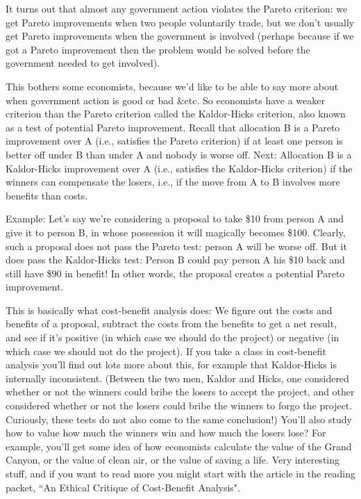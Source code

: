 It turns out that almost any government action violates the Pareto criterion: we get Pareto improvements when two people voluntarily trade, but we don't usually get Pareto improvements when the government is involved (perhaps because if we got a Pareto improvement then the problem would be solved before the government needed to get involved).

This bothers some economists, because we'd like to be able to say more about when government action is good or bad \&etc. So economists have a weaker criterion than the Pareto criterion called the Kaldor-Hicks criterion, also known as a test of potential Pareto improvement. Recall that allocation B is a Pareto improvement over A (i.e., satisfies the Pareto criterion) if at least one person is better off under B than under A and nobody is worse off. Next: Allocation B is a Kaldor-Hicks improvement over A (i.e., satisfies the Kaldor-Hicks criterion) if the winners can compensate the losers, i.e., if the move from A to B involves more benefits than costs. 

Example: Let's say we're considering a proposal to take \$10 from person A and give it to person B, in whose possession it will magically becomes \$100. Clearly, such a proposal does not pass the Pareto test: person A will be worse off. But it does pass the Kaldor-Hicks test: Person B could pay person A his \$10 back and still have \$90 in benefit! In other words, the proposal creates a potential Pareto improvement. 

 This is basically what cost-benefit analysis does: We figure out the costs and benefits of a proposal, subtract the costs from the benefits to get a net result, and see if it's positive (in which case we should do the project) or negative (in which case we should not do the project). If you take a class in cost-benefit analysis you'll find out lots more about this, for example that Kaldor-Hicks is internally inconsistent. (Between the two men, Kaldor and Hicks, one considered whether or not the winners could bribe the losers to accept the project, and other considered whether or not the losers could bribe the winners to forgo the project. Curiously, these tests do not also come to the same conclusion!) You'll also study how to value how much the winners win and how much the losers lose? For example, you'll get some idea of how economists calculate the value of the Grand Canyon, or the value of clean air, or the value of saving a life. Very interesting stuff, and if you want to read more you might start with the article in the reading packet, ``An Ethical Critique of Cost-Benefit Analysis".   









